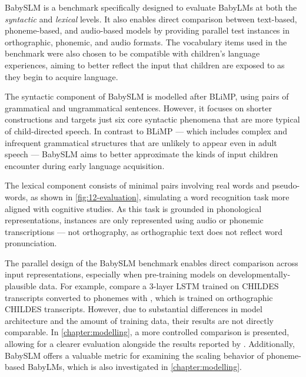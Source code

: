 

BabySLM \citep{lavechin} is a benchmark specifically designed to evaluate BabyLMs at both the \emph{syntactic} and \emph{lexical} levels. It also enables direct comparison between text-based, phoneme-based, and audio-based models by providing parallel test instances in orthographic, phonemic, and audio formats. The vocabulary items used in the benchmark were also chosen to be compatible with children's language experiences, aiming to better reflect the input that children are exposed to as they begin to acquire language. 

The syntactic component of BabySLM is modelled after BLiMP, using pairs of grammatical and ungrammatical sentences. However, it focuses on shorter constructions and targets just six core syntactic phenomena that are more typical of child-directed speech. In contrast to BLiMP --- which includes complex and infrequent grammatical structures that are unlikely to appear even in adult speech --- BabySLM aims to better approximate the kinds of input children encounter during early language acquisition. 

The lexical component consists of minimal pairs involving real words and pseudo-words, as shown in \cref{fig:12-evaluation}, simulating a word recognition task more aligned with cognitive studies. As this task is grounded in phonological representations, instances are only represented using audio or phonemic transcriptions --- not orthography, as orthographic text does not reflect word pronunciation. 

The parallel design of the BabySLM benchmark enables direct comparison across input representations, especially when pre-training models on developmentally-plausible data. For example, \citet{lavechin} compare a 3-layer LSTM trained on CHILDES transcripts converted to phonemes with , which is trained on orthographic CHILDES transcripts. However, due to substantial differences in model architecture and the amount of training data, their results are not directly comparable. In \cref{chapter:modelling}, a more controlled comparison is presented, allowing for a clearer evaluation alongside the results reported by \citet{lavechin}. Additionally, BabySLM offers a valuable metric for examining the scaling behavior of phoneme-based BabyLMs, which is also investigated in \cref{chapter:modelling}. 

